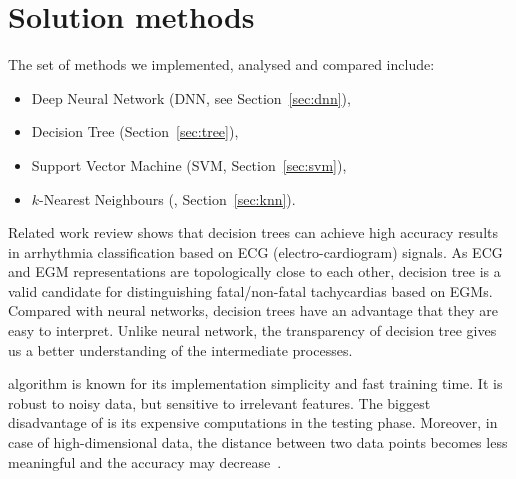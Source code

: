 \section{Solution methods}
\label{sec:methods}

The set of methods we implemented, analysed and compared include: 
\begin{itemize}
	\item Deep Neural Network (DNN, see Section~\ref{sec:dnn}),
	\item Decision Tree (Section~\ref{sec:tree}),
	\item Support Vector Machine (SVM, Section~\ref{sec:svm}),
	\item $k$-Nearest Neighbours (\knn{}, Section~\ref{sec:knn}).	
\end{itemize}

Related work review shows that decision trees can achieve high 
accuracy results in arrhythmia classification based on ECG 
(electro-cardiogram) signals. 
As ECG and EGM representations are topologically close to each other, 
decision tree is a valid candidate for distinguishing fatal/non-fatal 
tachycardias based on EGMs.
Compared with neural networks, decision trees have an advantage that 
they are easy to interpret. 
Unlike neural network, the transparency of decision tree gives us a 
better understanding of the intermediate processes.
 
\knn{} algorithm is known for its implementation simplicity and fast 
training time. 
It is robust to noisy data, but sensitive to 
irrelevant features. 
The biggest disadvantage of \knn{} is its expensive computations in 
the testing phase. 
Moreover, in case of high-dimensional data, the distance between 
two data points becomes less meaningful and the accuracy may 
decrease~\cite{beyer1999nearest}. 



